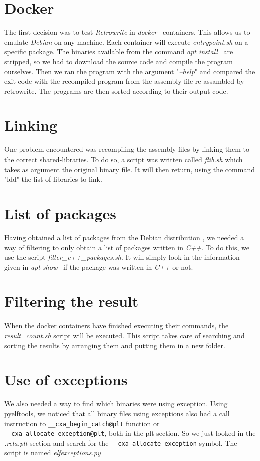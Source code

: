 \documentclass[a4paper,11pt,oneside]{report}
\begin{document}
\section{Docker}
The first decision was to test \textit{Retrowrite} in
\textit{docker}~\cite{merkel2014docker} containers. This allows us to emulate
\textit{Debian} on any machine. Each container will execute
\textit{entrypoint.sh} on a specific package. The binaries available from the
command \textit{apt install}~\cite{apt} are stripped, so we had to download the
source code and compile the program ourselves. Then we ran the program with the
argument "\textit{--help}" and compared the exit code with the recompiled
program from the assembly file re-assambled by retrowrite. The programs are
then sorted according to their output code.


\section{Linking}
One problem encountered was recompiling the
assembly files by linking them to the correct shared-libraries. To do so, a 
script was written called  \textit{flib.sh} which takes as argument the original binary
file. It will then return, using the command "ldd"\cite{ldd} the list of
libraries to link. 

\section{List of packages}

Having obtained a list of packages from the Debian distribution
\cite{sourcePackage}, we needed a way of filtering to only obtain
a list of packages written in \textit{C++}. To do this, we use the script
\textit{filter\_c++\_packages.sh}. It will simply look in the information given
in \textit{apt show}~\cite{apt} if the package was written in \textit{C++} or
not. 

\section{Filtering the result}
When the docker containers have finished executing their commands, the
\textit{result\_count.sh} script will be executed. This script takes care of searching
and sorting the results by arranging them and putting them in a new folder.

\section{Use of exceptions}
We also needed a way to find which binaries were using exception. Using
pyelftools, we noticed that all binary files using exceptions also had a call
instruction to \verb|__cxa_begin_catch@plt| function or
\verb|__cxa_allocate_exception@plt|, both in the plt section. So we just looked
in the \textit{.rela.plt} section and search for the
\verb|__cxa_allocate_exception| symbol. The script is named
\textit{elfexceptions.py}
\end{document}
